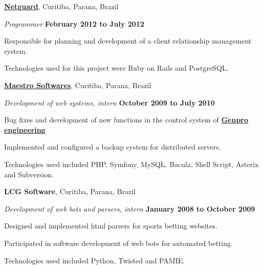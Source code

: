 \documentclass[10pt]{article}
\newenvironment{outerlist}[1][\enskip\textbullet]%
        {\begin{itemize}[#1]}{\end{itemize}%
         \vspace{-.6\baselineskip}}
\newenvironment{innerlist}[1][\enskip\textbullet]%
        {\begin{compactitem}[#1]}{\end{compactitem}}
\newcommand{\blankline}{\quad\pagebreak[2]}
\begin{document}
\href{http://netguard.com.br}{\textbf{Netguard}},
Curitiba, Parana, Brazil
\begin{outerlist}

\item[] \textit{Programmer}%
        \hfill \textbf{February 2012 to July 2012}
\begin{innerlist}
    \item Responsible for planning and development of a client relationship management system.
    \item Technologies used for this project were Ruby on Rails and PostgreSQL.
\end{innerlist}

\end{outerlist}

\blankline

\href{http://www.maestrosoft.com.br/}{\textbf{Maestro Softwares}},
Curitiba, Parana, Brazil
\begin{outerlist}

\item[] \textit{Development of web systems, intern}%
        \hfill \textbf{October 2009 to July 2010}
\begin{innerlist}
    \item Bug fixes and development of new functions in the control system
      of \href{http://www.genpro.com.br/}{\textbf{Genpro engineering}}
    \item Implemented and configured a backup system for distributed servers.
    \item Technologies used included PHP, Symfony, MySQL, Bacula, Shell Script, Asterix and Subversion.
\end{innerlist}

\end{outerlist}

\blankline

\textbf{LCG Software},
Curitiba, Parana, Brazil
\begin{outerlist}

\item[] \textit{Development of web bots and parsers, intern}%
        \hfill \textbf{January 2008 to October 2009}
\begin{innerlist}
    \item Designed and implemented html parsers for sports betting websites.
    \item Participated in software development of web bots for automated
      betting.
    \item Technologies used included Python, Twisted and PAMIE.
\end{innerlist}

\end{outerlist}
\end{document}
